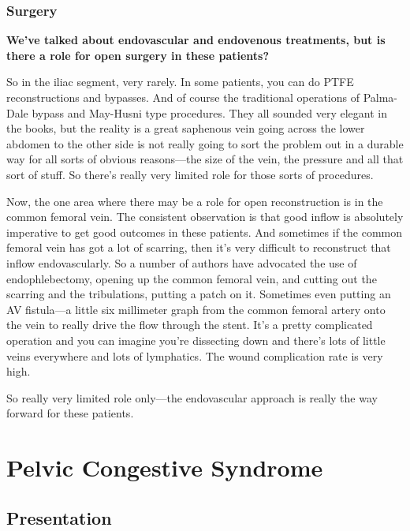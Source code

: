 \documentclass[
]{book}
\begin{document}
\hypertarget{surgery-2}{%
\subsubsection{Surgery}\label{surgery-2}}

\textbf{We've talked about endovascular and endovenous treatments, but is
there a role for open surgery in these patients?}

So in the iliac segment, very rarely. In some patients, you can do PTFE
reconstructions and bypasses. And of course the traditional operations
of Palma-Dale\citep{palma1960} bypass and May-Husni\citep{shaydakov2015} type
procedures. They all sounded very elegant in the books, but the reality
is a great saphenous vein going across the lower abdomen to the other
side is not really going to sort the problem out in a durable way for
all sorts of obvious reasons---the size of the vein, the pressure and
all that sort of stuff. So there's really very limited role for those
sorts of procedures.

Now, the one area where there may be a role for open reconstruction is
in the common femoral vein. The consistent observation is that good
inflow is absolutely imperative to get good outcomes in these patients.
And sometimes if the common femoral vein has got a lot of scarring, then
it's very difficult to reconstruct that inflow endovascularly. So a
number of authors have advocated the use of endophlebectomy, opening up
the common femoral vein, and cutting out the scarring and the
tribulations, putting a patch on it. Sometimes even putting an AV
fistula---a little six millimeter graph from the common femoral artery
onto the vein to really drive the flow through the stent. It's a pretty
complicated operation and you can imagine you're dissecting down and
there's lots of little veins everywhere and lots of lymphatics. The
wound complication rate is very high.

So really very limited role only---the endovascular approach is really
the way forward for these patients.

\hypertarget{pelvic-congestive-syndrome}{%
\section{Pelvic Congestive Syndrome}\label{pelvic-congestive-syndrome}}

\hypertarget{presentation-13}{%
\subsection{Presentation}\label{presentation-13}}
\end{document}
